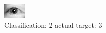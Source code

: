 \begin{figure}[h!]
\begin{center}
\includegraphics[width=0.60\columnwidth]{figures/ID3090_class_2_target_3.png}
\end{center}
\caption{ Classification: 2 actual target: 3}
\label{fig:ID3090_class_2_target_3}
\end{figure}
